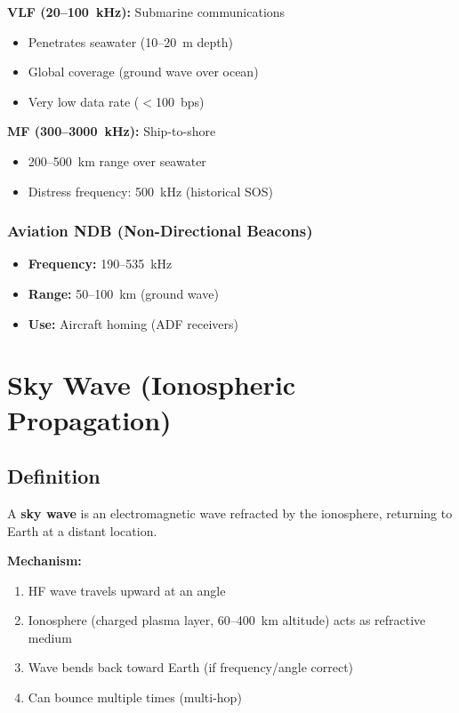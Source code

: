 \textbf{VLF (20--100~kHz):} Submarine communications
\begin{itemize}
\item Penetrates seawater (10--20~m depth)
\item Global coverage (ground wave over ocean)
\item Very low data rate ($<$100~bps)
\end{itemize}

\textbf{MF (300--3000~kHz):} Ship-to-shore
\begin{itemize}
\item 200--500~km range over seawater
\item Distress frequency: 500~kHz (historical SOS)
\end{itemize}

\subsubsection{Aviation NDB (Non-Directional Beacons)}

\begin{itemize}
\item \textbf{Frequency:} 190--535~kHz
\item \textbf{Range:} 50--100~km (ground wave)
\item \textbf{Use:} Aircraft homing (ADF receivers)
\end{itemize}

\section{Sky Wave (Ionospheric Propagation)}
\label{sec:sky-wave}

\subsection{Definition}

A \textbf{sky wave} is an electromagnetic wave refracted by the ionosphere, returning to Earth at a distant location.

\textbf{Mechanism:}
\begin{enumerate}
\item HF wave travels upward at an angle
\item Ionosphere (charged plasma layer, 60--400~km altitude) acts as refractive medium
\item Wave bends back toward Earth (if frequency/angle correct)
\item Can bounce multiple times (multi-hop)
\end{enumerate}

